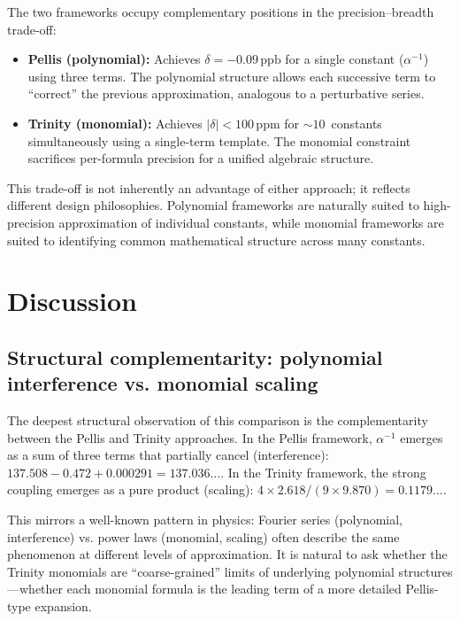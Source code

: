 \documentclass[11pt,a4paper]{article}
\newcommand{\ppm}{\,\mathrm{ppm}}
\newcommand{\ppb}{\,\mathrm{ppb}}
\begin{document}
The two frameworks occupy complementary positions in the precision--breadth
trade-off:

\begin{itemize}
\item \textbf{Pellis (polynomial):} Achieves $\delta = -0.09\ppb$ for a
single constant ($\alpha^{-1}$) using three terms. The polynomial structure
allows each successive term to ``correct'' the previous approximation,
analogous to a perturbative series.

\item \textbf{Trinity (monomial):} Achieves $|\delta| < 100\ppm$ for
$\sim 10$~constants simultaneously using a single-term template. The monomial
constraint sacrifices per-formula precision for a unified algebraic structure.
\end{itemize}

This trade-off is not inherently an advantage of either approach; it reflects
different design philosophies. Polynomial frameworks are naturally suited to
high-precision approximation of individual constants, while monomial
frameworks are suited to identifying common mathematical structure across
many constants.

\section{Discussion}\label{sec:discussion}

\subsection{Structural complementarity: polynomial interference vs. monomial scaling}

The deepest structural observation of this comparison is the complementarity
between the Pellis and Trinity approaches. In the Pellis framework,
$\alpha^{-1}$ emerges as a sum of three terms that partially cancel
(interference): $137.508 - 0.472 + 0.000291 = 137.036\ldots$. In the Trinity
framework, the strong coupling emerges as a pure product (scaling):
$4\times 2.618 / (9\times 9.870) = 0.1179\ldots$.

This mirrors a well-known pattern in physics: Fourier series (polynomial,
interference) vs. power laws (monomial, scaling) often describe the same
phenomenon at different levels of approximation. It is natural to ask whether
the Trinity monomials are ``coarse-grained'' limits of underlying polynomial
structures---whether each monomial formula is the leading term of a more
detailed Pellis-type expansion.
\end{document}
